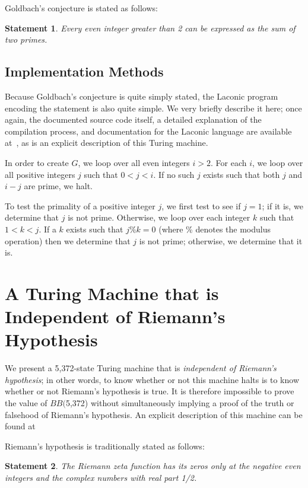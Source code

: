 \documentclass[11pt]{article}
\newtheorem{statement}{Statement}
\newcommand{\rmstatenumstate}{5,372-state }
\newcommand{\bbrmstatenum}{$BB($5,372) }
\begin{document}
Goldbach's conjecture is stated as follows:

\begin{statement}
\emph{Every even integer greater than 2 can be expressed as the sum of two primes.}
\label{goldbachstatement}
\end{statement}

\subsection{Implementation Methods}

Because Goldbach's conjecture is quite simply stated, the Laconic program encoding the statement is also quite simple. We very briefly describe it here; once again, the documented source code itself, a detailed explanation of the compilation process, and documentation for the Laconic language are available at~\cite{github}, as is an explicit description of this Turing machine.

In order to create $G$, we loop over all even integers $i > 2$. For each $i$, we loop over all positive integers $j$ such that $0 < j < i$. If no such $j$ exists such that both $j$ and $i - j$ are prime, we halt.

To test the primality of a positive integer $j$, we first test to see if $j = 1$; if it is, we determine that $j$ is not prime. Otherwise, we loop over each integer $k$ such that $1 < k < j$. If a $k$ exists such that $j \% k = 0$ (where \% denotes the modulus operation) then we determine that $j$ is not prime; otherwise, we determine that it is.

\section{A Turing Machine that is Independent of Riemann's Hypothesis}

We present a \rmstatenumstate Turing machine that is \emph{independent of Riemann's hypothesis}; in other words, to know whether or not this machine halts is to know whether or not Riemann's hypothesis is true. It is therefore impossible to prove the value of \bbrmstatenum without simultaneously implying a proof of the truth or falsehood of Riemann's hypothesis. An explicit description of this machine can be found at~\cite{github}

Riemann's hypothesis is traditionally stated as follows:

\begin{statement}
\emph{The Riemann zeta function has its zeros only at the negative even integers and the complex numbers with real part 1/2.}
\label{goldbachstatement}
\end{statement}
\end{document}
